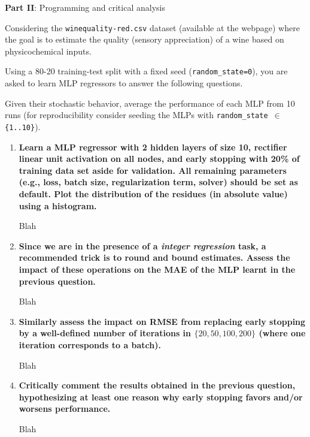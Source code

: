 \documentclass[12pt]{article}
\begin{document}
\vskip 0.5cm

\begin{center}
\large{\textbf{Part II}: Programming and critical analysis}\normalsize
\end{center}

\noindent Considering the \texttt{winequality-red.csv} dataset (available at the webpage) where the goal is  to estimate the quality (sensory appreciation)
of a wine based on physicochemical inputs.

\vskip 0.2cm

\noindent Using a 80-20 training-test split with a fixed seed (\texttt{random\_state=0}), you are asked to learn MLP
regressors to answer the following questions.

\vskip 0.2cm

\noindent Given their stochastic behavior, average the performance of each MLP from 10 runs (for reproducibility consider seeding the MLPs with
\texttt{random\_state $\in$ \{1..10\}}).

\begin{enumerate}[leftmargin=\labelsep]
    \item \textbf{Learn a MLP regressor with 2 hidden layers of size 10, rectifier linear unit activation
          on all nodes, and early stopping with 20\% of training data set aside for validation. All
          remaining parameters (e.g., loss, batch size, regularization term, solver) should be set as
          default. Plot the distribution of the residues (in absolute value) using a histogram.}

          \vskip 0.3cm
          Blah

    \item \textbf{Since we are in the presence of a \textit{integer regression} task, a recommended trick is to
          round and bound estimates. Assess the impact of these operations on the MAE of the MLP learnt in the previous question.}

          \vskip 0.3cm
          Blah

    \item \textbf{Similarly assess the impact on RMSE from replacing early stopping by a well-defined
          number of iterations in $\{20,50,100,200\}$ (where one iteration corresponds to a batch).}

           \vskip 0.3cm
           Blah

    \item \textbf{Critically comment the results obtained in the previous question, hypothesizing at least
          one reason why early stopping favors and/or worsens performance.}

          \vskip 0.3cm
          Blah
\end{enumerate}
\end{document}
